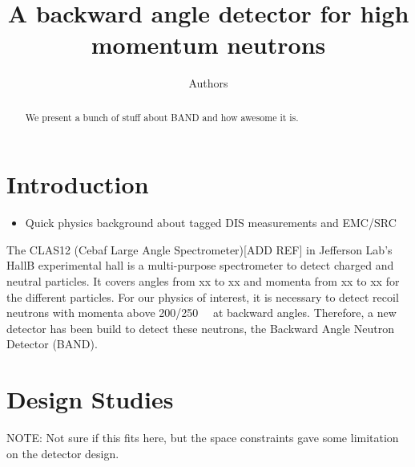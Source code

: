 \documentclass[review]{elsarticle}
\begin{document}
\begin{frontmatter}

\title{A backward angle detector for high momentum neutrons}

\author{Authors}
\address{Addresses}

\author[]{}
\ead[]{}

\begin{abstract}
We present a bunch of stuff about BAND and how awesome it is.
\end{abstract}

\begin{keyword}
\end{keyword}
\end{frontmatter}

\linenumbers

\section{Introduction}
\begin{itemize}
\item Quick physics background about tagged DIS measurements and EMC/SRC
\end{itemize}

The CLAS12 (Cebaf Large Angle Spectrometer)[ADD REF] in Jefferson Lab's HallB experimental hall is a multi-purpose spectrometer to detect charged and neutral particles. It covers angles from xx to xx and momenta from xx to xx for the different particles. For our physics of interest, it is necessary to detect recoil neutrons with momenta above \SI{200/250}{\mega\eVperc} at backward angles. Therefore, a new detector has been build to detect these neutrons, the Backward Angle Neutron Detector (BAND). 


\section{Design Studies}
NOTE: Not sure if this fits here, but the space constraints gave some limitation on the detector design.
\end{document}
